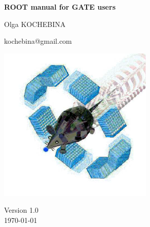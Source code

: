 \begin{titlepage}
\vspace*{1cm}
{\boldmath\huge
\begin{center}
\textbf{ROOT manual for GATE users}
\end{center}
}

\vspace*{1cm}
\begin{center}
Olga KOCHEBINA
\end{center}
\begin{center}
kochebina@gmail.com
\end{center}

\begin{center}
\includegraphics[width=.5\textwidth]{figs/gate_logo.png}
\end{center}

\vspace*{1cm}
\begin{center}
Version 1.0\\
\vspace*{0.5cm}
\today
\end{center}

\vspace*{5.0cm}

\vspace{\fill}



\vspace*{1.5cm}
\vspace{\fill}
\endgroup
\end{titlepage}


\pagestyle{empty}  %


\newpage
\setcounter{page}{2}
